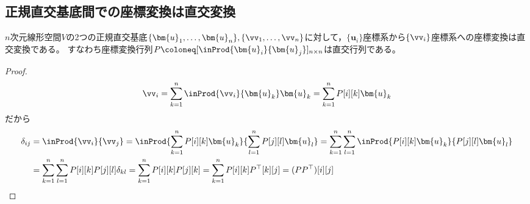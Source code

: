     \subsection{正規直交基底間での座標変換は直交変換}
        \begin{shadebox}
            $n$次元線形空間$V$の2つの正規直交基底$\{\bm{u}_1,\dots,\bm{u}_n\},\{\vv_1,\dotsc,\vv_n\}$に対して，$\{\bm{u}_i\}$座標系から$\{\vv_i\}$座標系への座標変換は直交変換である。
            すなわち座標変換行列$P \coloneq [\inProd{\bm{u}_i}{\bm{u}_j}]_{n\times n}$は直交行列である。
        \end{shadebox}
        \begin{proof}
            \[ \vv_i = \sum_{k=1}^n \inProd{\vv_i}{\bm{u}_k}\bm{u}_k = \sum_{k=1}^n P[i][k]\bm{u}_k \]
            だから
            \begin{align*}
                \delta_{ij} &= \inProd{\vv_i}{\vv_j} = \inProd{\sum_{k=1}^n P[i][k]\bm{u}_k}{\sum_{l=1}^n P[j][l]\bm{u}_l} = \sum_{k=1}^n\sum_{l=1}^n \inProd{P[i][k]\bm{u}_k}{P[j][l]\bm{u}_l}\\
                &= \sum_{k=1}^n\sum_{l=1}^n P[i][k]P[j][l]\delta_{kl} = \sum_{k=1}^n P[i][k]P[j][k] = \sum_{k=1}^n P[i][k]P^\top[k][j] = (PP^\top)[i][j]
            \end{align*}
        \end{proof}